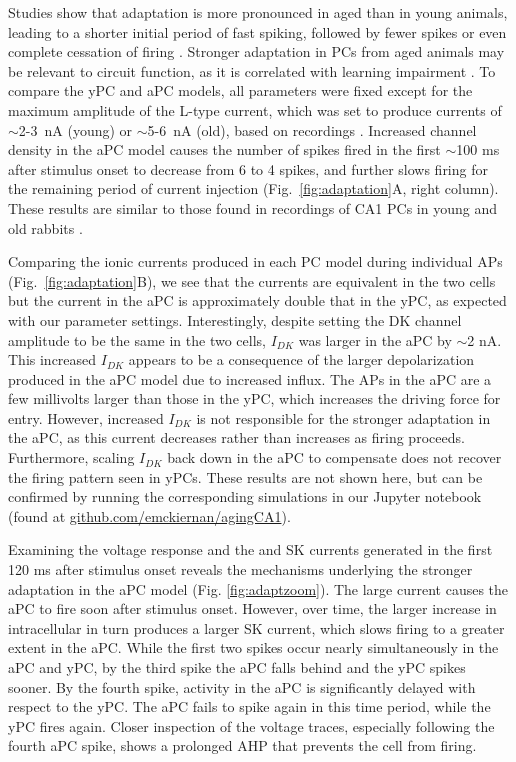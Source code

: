 \documentclass[12pt]{article}
\begin{document}
Studies show that adaptation is more pronounced in aged than in young animals, leading to a shorter initial period of fast spiking, followed by fewer spikes or even complete cessation of firing \citep{disterhoft1996calcium,gant2006early,moyer1992nimodipine,tombaugh2005slow}. Stronger adaptation in PCs from aged animals may be relevant to circuit function, as it is correlated with learning impairment \cite{disterhoft1996calcium,tombaugh2005slow}. To compare the yPC and aPC models, all parameters were fixed except for the maximum amplitude of the L-type {\Ca} current, which was set to produce currents of $\sim$2-3~nA (young) or $\sim$5-6~nA (old), based on recordings \citep{campbell1996aging}. Increased {\Ca} channel density in the aPC model causes the number of spikes fired in the first $\sim$100 ms after stimulus onset to decrease from 6 to 4 spikes, and further slows firing for the remaining period of current injection (Fig.~\ref{fig:adaptation}A, right column). These results are similar to those found in recordings of CA1 PCs in young and old rabbits \citep{moyer1992nimodipine}.

Comparing the ionic currents produced in each PC model during individual APs (Fig.~\ref{fig:adaptation}B), we see that the {\Na} currents are equivalent in the two cells but the {\Ca} current in the aPC is approximately double that in the yPC, as expected with our parameter settings. Interestingly, despite setting the DK channel amplitude to be the same in the two cells, $I_{DK}$ was larger in the aPC by $\sim$2 nA. This increased $I_{DK}$ appears to be a consequence of the larger depolarization produced in the aPC model due to increased {\Ca} influx. The APs in the aPC are a few millivolts larger than those in the yPC, which increases the driving force for {\K} entry. However, increased $I_{DK}$ is not responsible for the stronger adaptation in the aPC, as this current decreases rather than increases as firing proceeds. Furthermore, scaling $I_{DK}$ back down in the aPC to compensate does not recover the firing pattern seen in yPCs. These results are not shown here, but can be confirmed by running the corresponding simulations in our Jupyter notebook (found at \href{https://github.com/emckiernan/agingCA1}{github.com/emckiernan/agingCA1}).

Examining the voltage response and the {\Ca} and SK currents generated in the first 120 ms after stimulus onset reveals the mechanisms underlying the stronger adaptation in the aPC model (Fig. \ref{fig:adaptzoom}). The large {\Ca} current causes the aPC to fire soon after stimulus onset. However, over time, the larger increase in intracellular {\Ca} in turn produces a larger SK current, which slows firing to a greater extent in the aPC. While the first two spikes occur nearly simultaneously in the aPC and yPC, by the third spike the aPC falls behind and the yPC spikes sooner. By the fourth spike, activity in the aPC is significantly delayed with respect to the yPC. The aPC fails to spike again in this time period, while the yPC fires again. Closer inspection of the voltage traces, especially following the fourth aPC spike, shows a prolonged AHP that prevents the cell from firing.
\end{document}
